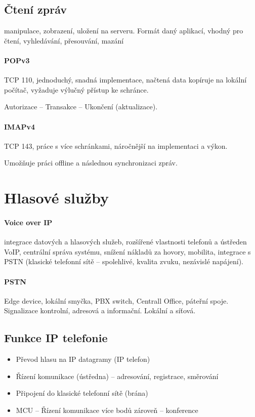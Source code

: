 \documentclass[a4paper, 11pt]{report}
\begin{document}
\subsection{Čtení zpráv}

manipulace, zobrazení, uložení na serveru. Formát daný aplikací, vhodný pro čtení, vyhledávání, přesouvání, mazání

\paragraph{POPv3}
TCP 110, jednoduchý, snadná implementace, načtená data kopíruje na lokální počítač, vyžaduje výlučný přístup ke schránce.

Autorizace -- Transakce -- Ukončení (aktualizace).

\paragraph{IMAPv4}
TCP 143, práce s více schránkami, náročnější na implementaci a výkon.

Umožňuje práci offline a následnou synchronizaci zpráv.


\section{Hlasové služby}

\paragraph{Voice over IP} integrace datových a hlasových služeb, rozšířené vlastnosti telefonů a ústředen VoIP, centrální správa systému, snížení nákladů za hovory, mobilita, integrace s PSTN (klasické telefonní sítě -- spolehlivé, kvalita zvuku, nezávislé napájení).

\paragraph{PSTN} Edge device, lokální smyčka, PBX switch, Centrall Office, páteřní spoje. Signalizace kontrolní, adresová a informační. Lokální a síťová.

\subsection{Funkce IP telefonie}
\begin{itemize}
	\item Převod hlasu na IP datagramy (IP telefon)
	\item Řízení komunikace (ústředna) -- adresování, registrace, směrování
	\item Připojení do klasické telefonní sítě (brána)
	\item MCU -- Řízení komunikace více bodů zároveň -- konference
\end{itemize}
\end{document}
